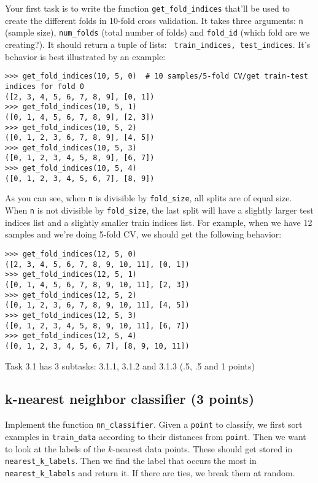 \documentclass{article}
\begin{document}
Your first task is to write the function {\tt get\_fold\_indices} that'll be used to create the different folds in 10-fold cross validation. It takes three arguments:
{\tt n} (sample size), {\tt num\_folds} (total number of folds) and {\tt fold\_id} (which fold are we creating?). It should return a tuple of lists: {\tt
train\_indices, test\_indices}. It's behavior is best illustrated by an example:
\begin{verbatim}
>>> get_fold_indices(10, 5, 0)  # 10 samples/5-fold CV/get train-test indices for fold 0
([2, 3, 4, 5, 6, 7, 8, 9], [0, 1])
>>> get_fold_indices(10, 5, 1)
([0, 1, 4, 5, 6, 7, 8, 9], [2, 3])
>>> get_fold_indices(10, 5, 2)
([0, 1, 2, 3, 6, 7, 8, 9], [4, 5])
>>> get_fold_indices(10, 5, 3)
([0, 1, 2, 3, 4, 5, 8, 9], [6, 7])
>>> get_fold_indices(10, 5, 4)
([0, 1, 2, 3, 4, 5, 6, 7], [8, 9])
\end{verbatim}

As you can see, when {\tt n} is divisible by {\tt fold\_size}, all splits are of equal size. When {\tt n} is not divisible by {\tt fold\_size}, the last split will have a slightly larger
test indices list and a slightly smaller train indices list. For example, when we have 12 samples and we're doing 5-fold CV, we should get the following behavior:
\begin{verbatim}
>>> get_fold_indices(12, 5, 0)
([2, 3, 4, 5, 6, 7, 8, 9, 10, 11], [0, 1])
>>> get_fold_indices(12, 5, 1)
([0, 1, 4, 5, 6, 7, 8, 9, 10, 11], [2, 3])
>>> get_fold_indices(12, 5, 2)
([0, 1, 2, 3, 6, 7, 8, 9, 10, 11], [4, 5])
>>> get_fold_indices(12, 5, 3)
([0, 1, 2, 3, 4, 5, 8, 9, 10, 11], [6, 7])
>>> get_fold_indices(12, 5, 4)
([0, 1, 2, 3, 4, 5, 6, 7], [8, 9, 10, 11])
\end{verbatim}

Task 3.1 has 3 subtasks: 3.1.1, 3.1.2 and 3.1.3 (.5, .5 and 1 points)

\subsection{k-nearest neighbor classifier (3 points)}

Implement the function {\tt nn\_classifier}. Given a {\tt point} to classify, we first sort examples in {\tt train\_data} according to their distances from {\tt point}. Then we
want to look at the labels of the $k$-nearest data points. These should get stored in {\tt nearest\_k\_labels}. Then we find the label that occurs the most in 
{\tt nearest\_k\_labels} and return it. If there are ties, we break them at random.
\end{document}
